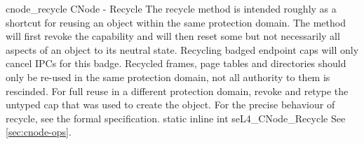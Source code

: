 %
%
%
%

\apidoc
{cnode_recycle}
{CNode  -  Recycle}
{The recycle method is intended roughly as a shortcut for reusing an
object within the same protection domain. The method will first revoke the
capability and will then reset some but not necessarily all aspects of an
object to its neutral state. Recycling badged endpoint caps will only cancel
IPCs for this badge. 
Recycled frames, page tables and directories should only
be re-used in the same protection domain, not all authority to them is
rescinded. For full reuse in a different protection domain, revoke and retype
the untyped cap that was used to create the object. For the precise behaviour
of recycle, see the formal specification.}
{static inline int seL4\_CNode\_Recycle}
{
}
{\errorenumdesc}
{See \autoref{sec:cnode-ops}.}

